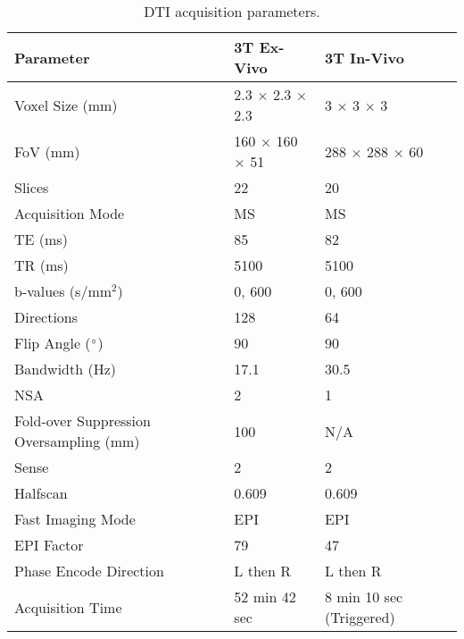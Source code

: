 \begin{table}[H]
	\centering
	\begin{tabularx}{1.0\textwidth}{X|X|X}
		\textbf{Parameter}                      & \textbf{3T Ex-Vivo} & \textbf{3T In-Vivo}      \\ \hline
		Voxel Size (mm)                         & 2.3 $\times$ 2.3 $\times$ 2.3     & 3 $\times$ 3 $\times$ 3                \\ \hline
		FoV (mm)                                & 160 $\times$ 160 $\times$ 51      & 288 $\times$ 288 $\times$ 60           \\ \hline
		Slices                                  & 22                  & 20                       \\ \hline
		Acquisition Mode                        & MS                  & MS                       \\ \hline
		TE (ms)                                 & 85                  & 82                       \\ \hline
		TR (ms)                                 & 5100                & 5100                     \\ \hline
		b-values (s/mm$^2$)                     & 0, 600              & 0, 600                   \\ \hline
		Directions                              & 128                 & 64                       \\ \hline
		Flip Angle ($\degree$)                  & 90                  & 90                       \\ \hline
		Bandwidth (Hz)                          & 17.1                & 30.5                     \\ \hline
		NSA                                     & 2                   & 1                        \\ \hline
		Fold-over Suppression Oversampling (mm) & 100                 & N/A                      \\ \hline
		Sense                                   & 2                   & 2                        \\ \hline
		Halfscan                                & 0.609               & 0.609                    \\ \hline
		Fast Imaging Mode                       & EPI                 & EPI                      \\ \hline
		EPI Factor                              & 79                  & 47                       \\ \hline
		Phase Encode Direction                  & L then R            & L then R                 \\ \hline
		Acquisition Time                        & 52 min 42 sec       & 8 min 10 sec (Triggered)
	\end{tabularx}
	\caption{\ac{DTI} acquisition parameters.}
	\label{tab:ex_dti_mapping}
\end{table}

